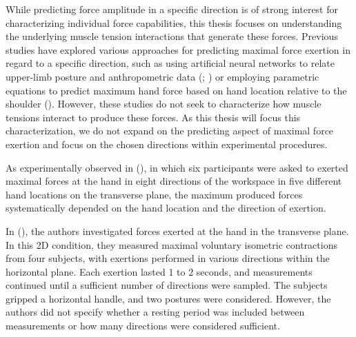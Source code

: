 While predicting force amplitude in a specific direction is of strong interest for characterizing individual force capabilities, this thesis focuses on understanding the underlying muscle tension interactions that generate these forces. Previous studies have explored various approaches for predicting maximal force exertion in regard to a specific direction, such as using artificial neural networks to relate upper-limb posture and anthropometric data (\cite{ladelfaArmForceField2017a}; \cite{ladelfaPredictingManualArm2016b}) or employing parametric equations to predict maximum hand force based on hand location relative to the shoulder (\cite{ladelfaEquationsPredictFemale2014a}). However, these studies do not seek to characterize how muscle tensions interact to produce these forces. As this thesis will focus this characterization, we do not expand on the predicting aspect of maximal force exertion and focus on the chosen directions within experimental procedures. 

As experimentally observed in (\cite{jannijhofMaximumIsometricArm2006a}), in which six participants were asked to exerted maximal forces at the hand in eight directions of the workspace in five different hand locations on the transverse plane, the maximum produced forces systematically depended on the hand location and the direction of exertion.

In (\cite{oshimaRoboticAnalysesOutput2000}), the authors investigated forces exerted at the hand in the transverse plane. In this 2D condition, they measured maximal voluntary isometric contractions from four subjects, with exertions performed in various directions within the horizontal plane. Each exertion lasted 1 to 2 seconds, and measurements continued until a sufficient number of directions were sampled. The subjects gripped a horizontal handle, and two postures were considered. However, the authors did not specify whether a resting period was included between measurements or how many directions were considered sufficient. 

